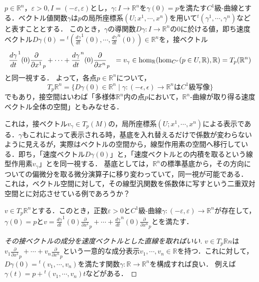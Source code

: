 \documentclass[uplatex, dvipdfmx]{jsreport}
\begin{document}
\begin{definition}[速度ベクトルを接ベクトルへと同一視]\rm{}
    $p\in\mathbb{R}^n$，$\varepsilon>0, I=(-\varepsilon,\varepsilon)$とし，$\gamma:I\to\mathbb{R}^n$を$\gamma(0)=p$を満たす$C^1$級-曲線とする．ベクトル値関数$\gamma$は$p$の局所座標系$(U;x^1,\cdots,x^n)$を用いて${}^t\! (\gamma^1,\cdots,\gamma^n)$などと表すこととする．
    このとき，$\gamma$の導関数$D\gamma :I\to\mathbb{R}^n$の$0$に於ける値，即ち速度ベクトル$D\gamma(0)={}^t\!\left( \frac{d\gamma}{dt}^1(0),\cdots,\frac{d\gamma}{dt}^n(0) \right)\in\mathbb{R}^n$を，接ベクトル
    \[ \frac{d\gamma}{dt}^1(0)\frac{\partial}{\partial x^1}_p + \cdots + \frac{d\gamma}{dt}^n(0)\frac{\partial}{\partial x^n}_p\hspace{2mm} = v_\gamma\in\hom_\mathbb{R}(\hom_{C^r}(p\in U,\mathbb{R}),\mathbb{R})= T_p(\mathbb{R}^n) \]
    と同一視する．
    よって，各点$p\in\mathbb{R}^n$について，
    \[T_p\mathbb{R}^n = \{ D\gamma(0)\in\mathbb{R}^n\mid \gamma:(-\epsilon,\epsilon)\to\mathbb{R}^nはC^1級写像 \} \]
    でもあり，接空間はいわば「多様体$\mathbb{R}^n$内の点$p$において，$\mathbb{R}^n$-曲線が取り得る速度ベクトル全体の空間」ともみなせる．
\end{definition}
\begin{remark}
    これは，接ベクトル$v_\gamma\in T_p(M)$の，局所座標系$(U;x^1,\cdots,x^n)$による表示である．$\gamma$もこれによって表示される時，基底を入れ替えるだけで係数が変わらないように見えるが，実際はベクトルの空間から，線型作用素の空間へ移行している．即ち，「速度ベクトル$D\gamma (0)$」と，「速度ベクトルとの内積を取るという線型作用素$v_\gamma$」とを同一視する．
    基底としては，$\mathbb{R}^n$の標準基底から，その方向についての偏微分を取る微分演算子に移り変わっていて，同一視が可能である．
    これは，ベクトル空間に対して，その線型汎関数を係数体に写すという二重双対空間とに対応させている例であろうか？
\end{remark}

\begin{lemma}
    $v\in T_p\mathbb{R}^n$とする．このとき，正数$\varepsilon>0$と$C^1$級-曲線$\gamma:(-\varepsilon,\varepsilon)\to\mathbb{R}^n$が存在して，$\gamma(0)=p$と$v=\frac{d\gamma}{dt}^1(0)\frac{\partial}{\partial x^1}_p + \cdots + \frac{d\gamma}{dt}^n(0)\frac{\partial}{\partial x^n}_p$とを満たす．
\end{lemma}
\begin{proof}[その接ベクトルの成分を速度ベクトルとした直線を取ればいい]
    $v\in T_p\mathbb{R}n$は$v_1\frac{\partial}{\partial x^1}_p + \cdots + v_n\frac{\partial}{\partial x^n}_p$という一意的な成分表示$v_1,\cdots,v_n\in\mathbb{R}$を持つ．これに対して，$D\gamma(0)={}^t\!(v_1,\cdots,v_n)$を満たす関数$\gamma:\mathbb{R}\to\mathbb{R}^n$を構成すれば良い．
    例えば$\gamma(t)=p+{}^t\!(v_1,\cdots,v_n)t$などがある．
\end{proof}
\end{document}
